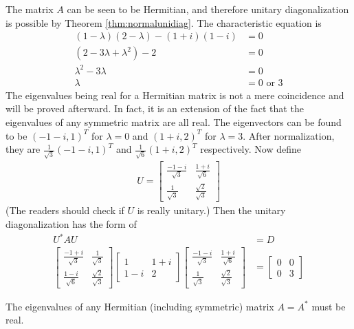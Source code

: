 \begin{solution}
The matrix $A$ can be seen to be Hermitian, and therefore unitary diagonalization is possible by Theorem \ref{thm:normalunidiag}. The characteristic equation is 
\begin{align*}
(1-\lambda)(2-\lambda) - (1+i)(1-i) &= 0 \\
(2 - 3\lambda + \lambda^2) - 2 &= 0 \\
\lambda^2 - 3\lambda &= 0 \\
\lambda &= 0 \text{ or } 3
\end{align*}
The eigenvalues being real for a Hermitian matrix is not a mere coincidence and will be proved afterward. In fact, it is an extension of the fact that the eigenvalues of any symmetric matrix are all real. The eigenvectors can be found to be $(-1-i, 1)^T$ for $\lambda = 0$ and $(1+i, 2)^T$ for $\lambda = 3$. After normalization, they are $\frac{1}{\sqrt{3}}(-1-i, 1)^T$ and $\frac{1}{\sqrt{6}}(1+i, 2)^T$ respectively. Now define
\begin{align*}
U =
\begin{bmatrix}
\frac{-1-i}{\sqrt{3}} & \frac{1+i}{\sqrt{6}} \\
\frac{1}{\sqrt{3}} & \frac{\sqrt{2}}{\sqrt{3}}
\end{bmatrix}
\end{align*}
(The readers should check if $U$ is really unitary.) Then the unitary diagonalization has the form of
\begin{align*}
U^* AU &= D \\
\begin{bmatrix}
\frac{-1+i}{\sqrt{3}} & \frac{1}{\sqrt{3}} \\
\frac{1-i}{\sqrt{6}} & \frac{\sqrt{2}}{\sqrt{3}}
\end{bmatrix}
\begin{bmatrix}
1 & 1+i \\
1-i & 2
\end{bmatrix}
\begin{bmatrix}
\frac{-1-i}{\sqrt{3}} & \frac{1+i}{\sqrt{6}} \\
\frac{1}{\sqrt{3}} & \frac{\sqrt{2}}{\sqrt{3}}
\end{bmatrix}
&=
\begin{bmatrix}
0 & 0 \\
0 & 3
\end{bmatrix}
\end{align*}
\end{solution}
\begin{proper}
\label{proper:hermrealeig}
The eigenvalues of any Hermitian (including symmetric) matrix $A = A^*$ must be real.
\end{proper}
